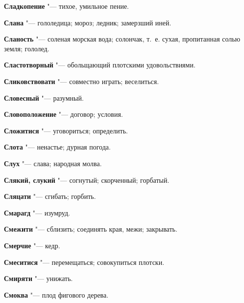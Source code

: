 \begin{mymulticols}{2}
\noindent\textbf{Сладкопение} "--- тихое, умильное пение. 




\noindent\textbf{Слана} "--- гололедица; мороз; ледник; замерзший иней. 




\noindent\textbf{Сланость} "--- соленая морская вода; солончак, т.~е. сухая, пропитанная солью земля; гололед. 




\noindent\textbf{Сластотворный} "--- обольщающий плотскими удовольствиями. 




\noindent\textbf{Сликовствовати} "--- совместно играть; веселиться. 




\noindent\textbf{Словесный} "--- разумный. 




\noindent\textbf{Словоположение} "--- договор; условия. 




\noindent\textbf{Сложитися} "--- уговориться; определить. 




\noindent\textbf{Слота} "--- ненастье; дурная погода. 




\noindent\textbf{Слух} "--- слава; народная молва. 




\noindent\textbf{Слякий, слукий} "--- согнутый; скорченный; горбатый. 




\noindent\textbf{Сляцати} "--- сгибать; горбить. 




\noindent\textbf{Смарагд} "--- изумруд. 




\noindent\textbf{Смежити} "--- сблизить; соединять края, межи; закрывать. 




\noindent\textbf{Смерчие} "--- кедр. 




\noindent\textbf{Смеситися} "--- перемещаться; совокупиться плотски. 




\noindent\textbf{Смиряти} "--- унижать. 




\noindent\textbf{Смоква} "--- плод фигового дерева. 





\end{mymulticols}
